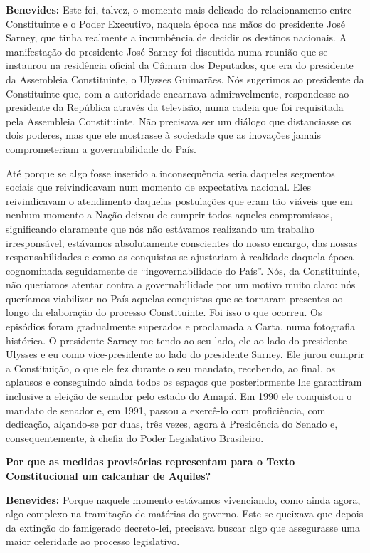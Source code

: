 \textbf{Benevides:} Este foi, talvez, o momento mais delicado do
relacionamento entre Constituinte e o Poder Executivo, naquela época nas
mãos do presidente José Sarney, que tinha realmente a incumbência de
decidir os destinos nacionais. A manifestação do presidente José Sarney
foi discutida numa reunião que se instaurou na residência oficial da
Câmara dos Deputados, que era do presidente da Assembleia Constituinte,
o Ulysses Guimarães. Nós sugerimos ao presidente da Constituinte que,
com a autoridade encarnava admiravelmente, respondesse ao presidente da
República através da televisão, numa cadeia que foi requisitada pela
Assembleia Constituinte. Não precisava ser um diálogo que distanciasse
os dois poderes, mas que ele mostrasse à sociedade que as inovações
jamais comprometeriam a governabilidade do País.

Até porque se algo fosse inserido a inconsequência seria daqueles
segmentos sociais que reivindicavam num momento de expectativa nacional.
Eles reivindicavam o atendimento daquelas postulações que eram tão
viáveis que em nenhum momento a Nação deixou de cumprir todos aqueles
compromissos, significando claramente que nós não estávamos realizando
um trabalho irresponsável, estávamos absolutamente conscientes do nosso
encargo, das nossas responsabilidades e como as conquistas se ajustariam
à realidade daquela época cognominada seguidamente de
``ingovernabilidade do País''. Nós, da Constituinte, não queríamos
atentar contra a governabilidade por um motivo muito claro: nós
queríamos viabilizar no País aquelas conquistas que se tornaram
presentes ao longo da elaboração do processo Constituinte. Foi isso o
que ocorreu. Os episódios foram gradualmente superados e proclamada a
Carta, numa fotografia histórica. O presidente Sarney me tendo ao seu
lado, ele ao lado do presidente Ulysses e eu como vice-presidente ao
lado do presidente Sarney. Ele jurou cumprir a Constituição, o que ele
fez durante o seu mandato, recebendo, ao final, os aplausos e
conseguindo ainda todos os espaços que posteriormente lhe garantiram
inclusive a eleição de senador pelo estado do Amapá. Em 1990 ele
conquistou o mandato de senador e, em 1991, passou a exercê-lo com
proficiência, com dedicação, alçando-se por duas, três vezes, agora à
Presidência do Senado e, consequentemente, à chefia do Poder Legislativo
Brasileiro.

\textbf{Por que as medidas provisórias representam para o Texto
Constitucional um calcanhar de Aquiles?}

\textbf{Benevides:} Porque naquele momento estávamos vivenciando, como
ainda agora, algo complexo na tramitação de matérias do governo. Este se
queixava que depois da extinção do famigerado decreto-lei, precisava
buscar algo que assegurasse uma maior celeridade ao processo
legislativo.


